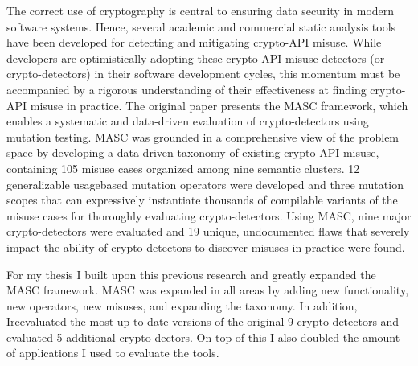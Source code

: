 \begin{large}
\noindent 
\begin{flushleft}
The correct use of cryptography is central to ensuring data security in modern software systems. Hence, several academic and commercial static analysis tools have been developed for detecting and mitigating crypto-API misuse. While developers are optimistically adopting these crypto-API misuse detectors (or crypto-detectors) in their software development cycles, this momentum must be accompanied by a rigorous understanding of their effectiveness at finding crypto-API misuse in practice. The original paper presents the MASC framework, which enables a systematic and data-driven evaluation of crypto-detectors using mutation testing. MASC was grounded in a comprehensive view of the problem space by developing a data-driven taxonomy of existing crypto-API misuse, containing 105 misuse cases organized among nine semantic clusters. 12 generalizable usagebased mutation operators were developed and three mutation scopes that can expressively instantiate thousands of compilable variants of the misuse cases for thoroughly evaluating crypto-detectors. Using MASC, nine major crypto-detectors were evaluated and 19 unique, undocumented flaws that severely impact the ability of crypto-detectors to discover misuses in practice were found.
\end{flushleft}

\begin{flushleft}
For my thesis I built upon this previous research and greatly expanded the MASC framework. MASC was expanded in all areas by adding new functionality, new operators, new misuses, and expanding the taxonomy. In addition, Ireevaluated the most up to date versions of the original 9 crypto-detectors and evaluated 5 additional crypto-dectors. On top of this I also doubled the amount of applications I used to evaluate the tools.
\end{flushleft}


\end{large}
